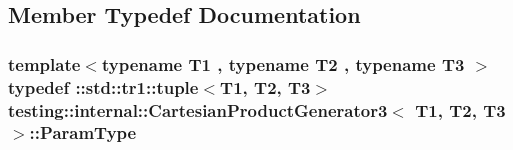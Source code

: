 \subsection{Member Typedef Documentation}
\hypertarget{classtesting_1_1internal_1_1CartesianProductGenerator3_a8819b73a6af2ecca7d25e09f759f2757}{
\subsubsection[{Param\-Type}]{\setlength{\rightskip}{0pt plus 5cm}template$<$typename T1 , typename T2 , typename T3 $>$ typedef \-::{\bf std\-::tr1\-::tuple}$<$T1, T2, T3$>$ {\bf testing\-::internal\-::\-Cartesian\-Product\-Generator3}$<$ T1, T2, T3 $>$\-::{\bf Param\-Type}}}\label{classtesting_1_1internal_1_1CartesianProductGenerator3_a8819b73a6af2ecca7d25e09f759f2757}


